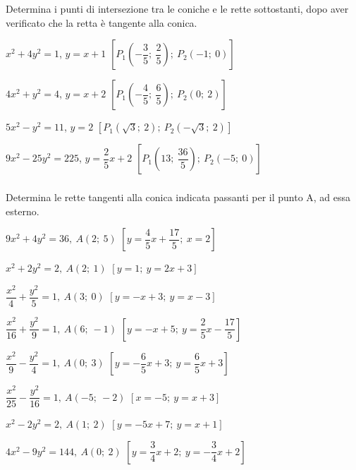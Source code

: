 \begin{esercizio}
  \label{ese:div.003}
  Determina i punti di intersezione tra le coniche e le rette 
sottostanti, dopo aver verificato che la retta è tangente alla conica.
  \begin{enumeratea}
  \item $ x^{2}+4y^{2}=1 $, $y=x+1$
  \hfill$\left[P_{1}\left( -\dfrac{3}{5};~\dfrac{2}{5} \right);~ 
P_{2}\left(-1;~0\right)\right]$
  \item  $4x^{2}+y^{2}=4 $, $y=x+2$
  \hfill$\left[P_{1}\left( -\dfrac{4}{5};~\dfrac{6}{5} \right);~ 
P_{2}\left(0;~2\right)\right]$
  \item $5x^{2}-y^{2}=11 $, $y=2$
  \hfill$\left[P_{1}\left( \sqrt{3};~2 \right);~ 
P_{2}\left(-\sqrt{3};~2\right)\right]$
  \item $9x^{2}-25y^{2}=225 $, $y=\dfrac{2}{5}x+2$
  \hfill $\left[P_{1}\left(13;~\dfrac{36}{5} \right);~ 
P_{2}\left(-5;~0\right)\right]$
  \end{enumeratea}
\end{esercizio}

\subsubsection*{}

\begin{esercizio}
  \label{ese:div.003}
  Determina le rette tangenti alla conica indicata passanti per il 
punto A, ad essa esterno.
  \begin{enumeratea}

\item $9x^{2}+4y^{2}=36,~A(2;~5)$  
\hfill $\left[y=\dfrac{4}{5}x+\dfrac{17}{5};~x=2\right]$
\item $x^{2}+2y^{2}=2,~A(2;~1)$
\hfill $\left[y=1;~y=2x+3\right]$
\item $\dfrac{x^{2}}{4}+\dfrac{y^{2}}{5}=1,~A(3;~0)$
\hfill $\left[y=-x+3;~y=x-3\right]$
\item $\dfrac{x^{2}}{16}+\dfrac{y^{2}}{9}=1,~A(6;~-1)$
\hfill $\left[y=-x+5;~y=\dfrac{2}{5}x-\dfrac{17}{5}\right]$
\item $\dfrac{x^{2}}{9}-\dfrac{y^{2}}{4}=1,~A(0;~3)$
\hfill $\left[y=-\dfrac{6}{5}x+3;~y=\dfrac{6}{5}x+3\right]$
\item $\dfrac{x^{2}}{25}-\dfrac{y^{2}}{16}=1,~A(-5;~-2)$ 
\hfill $\left[x=-5;~y=x+3\right]$
\item $x^{2}-2y^{2}=2,~A(1;~2)$
\hfill $\left[y=-5x+7;~y=x+1\right]$
\item $4x^{2}-9y^{2}=144,~A(0;~2)$
\hfill $\left[y=\dfrac{3}{4}x+2;~y=-\dfrac{3}{4}x+2\right]$
\end{enumeratea}
\end{esercizio}

